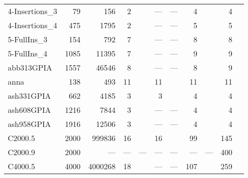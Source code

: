\begin{table}[t]
\begin{tabular}{lrrrlrlrlrl}
  4-Insertions\_3 & 79 & 156 & 2 & \cite{Malaguti2011} & --- & --- & 4 & \cite{Malaguti2010} & 4 & \cite{Malaguti2010,Mendez-Diaz2006,Mendez-Diaz2006,Malaguti2011,Gualandi2012,Brelaz1979,Sewell1996,Segundo2012} \\ 
  4-Insertions\_4 & 475 & 1795 & 2 & \cite{Malaguti2011} & --- & --- & 5 & \cite{Malaguti2010} & 5 & \cite{Malaguti2010,Mendez-Diaz2006,Mendez-Diaz2006,Malaguti2011,Gualandi2012,Brelaz1979,Sewell1996,Segundo2012} \\ 
  5-FullIns\_3 & 154 & 792 & 7 & \cite{Malaguti2011} & --- & --- & 8 & \cite{Mendez-Diaz2006,Malaguti2011,Gualandi2012} & 8 & \cite{Mendez-Diaz2006,Malaguti2011,Gualandi2012,Brelaz1979,Sewell1996,Segundo2012} \\ 
  5-FullIns\_4 & 1085 & 11395 & 7 & \cite{us} & --- & --- & 9 & \cite{Malaguti2010} & 9 & \cite{Mendez-Diaz2006,Mendez-Diaz2006,Malaguti2011,Gualandi2012,Mendez-Diaz2006,Brelaz1979,Sewell1996,Segundo2012} \\ 
  abb313GPIA & 1557 & 46546 & 8 & \cite{Held2011} & --- & --- & 8 & \cite{Mendez-Diaz2006,Held2011,Malaguti2011} & 9 & \cite{Malaguti2011} \\ 
  anna & 138 & 493 & 11 & \cite{Gualandi2012} & 11 & \cite{Gualandi2012} & 11 & \cite{Mehrotra1996,Mehrotra1996,Malaguti2011,Gualandi2012,Mendez-Diaz2006} & 11 & \cite{Mehrotra1996,Mehrotra1996,Malaguti2011,Wu2013a,Gualandi2012,Mendez-Diaz2006,Brelaz1979,Sewell1996,Segundo2012} \\ 
  ash331GPIA & 662 & 4185 & 3 & \cite{Malaguti2011} & 3 & \cite{Gualandi2012} & 4 & \cite{Mendez-Diaz2006,Mendez-Diaz2006,Malaguti2011,Gualandi2012} & 4 & \cite{Mendez-Diaz2006,Mendez-Diaz2006,Malaguti2011,Gualandi2012,Brelaz1979,Sewell1996,Segundo2012} \\ 
  ash608GPIA & 1216 & 7844 & 3 & \cite{Malaguti2011} & --- & --- & 4 & \cite{Mendez-Diaz2006,Mendez-Diaz2006,Malaguti2011} & 4 & \cite{Mendez-Diaz2006,Mendez-Diaz2006,Malaguti2011,Brelaz1979,Sewell1996,Segundo2012} \\ 
  ash958GPIA & 1916 & 12506 & 3 & \cite{Malaguti2011} & --- & --- & 4 & \cite{Mendez-Diaz2006,Mendez-Diaz2008} & 4 & \cite{Malaguti2011,Segundo2012} \\ 
  C2000.5 & 2000 & 999836 & 16 & \cite{Held2011} & 16 & \cite{Held2011} & 99 & \cite{Held2011} & 145 & \cite{Hao2012,Titiloye2012} \\ 
  C2000.9 & 2000 & --- & --- & --- & --- & --- & --- & --- & 400 & \cite{Titiloye2012} \\ 
  C4000.5 & 4000 & 4000268 & 18 & \cite{us} & --- & --- & 107 & \cite{Held2011} & 259 & \cite{Hao2012,Titiloye2012} \\ 

\end{tabular}
\end{table}
